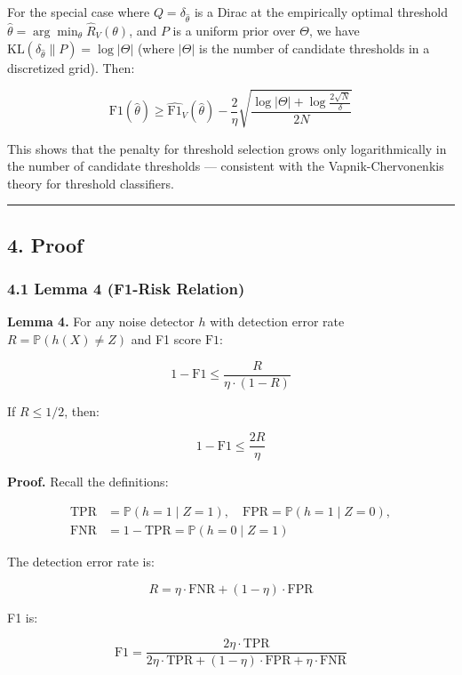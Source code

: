 \documentclass[
  12pt,
]{ctexart}
\begin{document}
For the special case where \(Q = \delta_{\hat{\theta}}\) is a Dirac at
the empirically optimal threshold
\(\hat{\theta} = \arg\min_\theta \hat{R}_V(\theta)\), and \(P\) is a
uniform prior over \(\Theta\), we have
\(\text{KL}(\delta_{\hat{\theta}} \parallel P) = \log|\Theta|\) (where
\(|\Theta|\) is the number of candidate thresholds in a discretized
grid). Then:

\[\text{F1}(\hat{\theta}) \geq \widehat{\text{F1}}_V(\hat{\theta}) - \frac{2}{\eta}\sqrt{\frac{\log|\Theta| + \log\frac{2\sqrt{N}}{\delta}}{2N}}\]

This shows that the penalty for threshold selection grows only
logarithmically in the number of candidate thresholds --- consistent
with the Vapnik-Chervonenkis theory for threshold classifiers.

\begin{center}\rule{0.5\linewidth}{0.5pt}\end{center}

\subsection{4. Proof}\label{proof}

\subsubsection{4.1 Lemma 4 (F1-Risk
Relation)}\label{lemma-4-f1-risk-relation}

\textbf{Lemma 4.} For any noise detector \(h\) with detection error rate
\(R = \mathbb{P}(h(X) \neq Z)\) and F1 score \(\text{F1}\):

\[1 - \text{F1} \leq \frac{R}{\eta \cdot (1 - R)}\]

If \(R \leq 1/2\), then:

\[1 - \text{F1} \leq \frac{2R}{\eta}\]

\textbf{Proof.} Recall the definitions:

\[\begin{aligned}
\text{TPR} &= \mathbb{P}(h = 1 \mid Z = 1), \quad
\text{FPR} = \mathbb{P}(h = 1 \mid Z = 0), \\
\text{FNR} &= 1 - \text{TPR} = \mathbb{P}(h = 0 \mid Z = 1)
\end{aligned}\]

The detection error rate is:

\[R = \eta \cdot \text{FNR} + (1-\eta) \cdot \text{FPR}\]

F1 is:

\[\text{F1} = \frac{2\eta \cdot \text{TPR}}{2\eta \cdot \text{TPR} + (1-\eta) \cdot \text{FPR} + \eta \cdot \text{FNR}}\]
\end{document}
